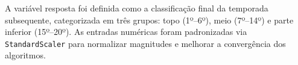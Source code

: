 \documentclass[a4paper]{article}
\theoremstyle{plain}
\theoremstyle{definition}
\begin{document}
A variável resposta foi definida como a classificação final da temporada subsequente, categorizada em três grupos: topo (1º–6º), meio (7º–14º) e parte inferior (15º–20º). As entradas numéricas foram padronizadas via \texttt{StandardScaler} para normalizar magnitudes e melhorar a convergência dos algoritmos.



\end{document}
